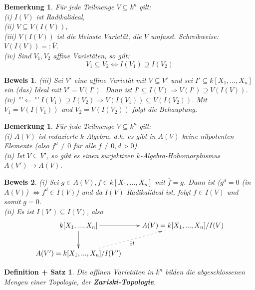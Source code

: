 \documentclass[a4paper,12pt]{report}
\theoremstyle{break}
\newtheorem{DefSatz}[Def]{Definition + Satz}
\newtheorem{Bem}[Def]{Bemerkung}
\theoremstyle{nonumberbreak}
\theoremstyle{nonumberplain}
\newtheorem{Bew}{Beweis}
\newcommand{\emp}[1]{\textbf{\emph{#1}}}
\newcommand{\begriff}[1]{{\index{#1}}\emp{#1}}
\newcommand{\defeql}[0]{=\mathrel{\mathop:}}
\begin{document}
\begin{Bem}
\label{bem:2.4}
Für jede Teilmenge $V\subseteq k^n$ gilt:\\
(i) $I(V)$ ist Radikalideal,\\
(ii) $V\subseteq V(I(V))$,\\
(iii) $V(I(V))$ ist die kleinste Varietät, die $V$ umfasst. Schreibweise: $V(I(V))\defeql\overline{V}$.\\
(iv) Sind $V_1, V_2$ affine Varietäten, so gilt:
$$V_1\subseteq V_2 \Leftrightarrow I(V_1)\supseteq I(V_2)$$
\end{Bem}
\begin{Bew}
(iii) Sei $V'$ eine affine Varietät mit $V\subseteq V'$ und sei $I'\subseteq k[X_1,...,X_n]$ ein (das) Ideal mit $V'=V(I')$. Dann ist $I'\subseteq I(V)\Rightarrow V(I')\supseteq V(I(V))$.\\
(iv) "'$\Leftarrow$"' $I(V_1)\supseteq I(V_2)\Rightarrow V(I(V_1))\subseteq V(I(V_2))$. Mit $V_1 = V(I(V_1))$ und $V_2= V(I(V_2))$ folgt die Behauptung.
\end{Bew}
\begin{Bem}
\label{bem:2.5}
Für jede Teilmenge $V\subseteq k^n$ gilt:\\
(i) $A(V)$ ist reduzierte $k$-Algebra, d.h. es gibt in $A(V)$ keine nilpotenten Elemente (also $f^d\neq 0$ für alle $f \neq 0, d>0$).\\
(ii) Ist $V\subseteq V'$, so gibt es einen surjektiven $k$-Algebra-Hohomorphismus $A(V')\longrightarrow A(V)$.
\end{Bem}
\begin{Bew}
(i) Sei $g\in A(V), f\in k[X_1,...,X_n]$ mit $\overline{f}=g$. Dann ist ($g^d=0$ (in $A(V)$) $\Leftrightarrow f^d\in I(V)$) und da $I(V)$ Radikalideal ist, folgt $f\in I(V)$ und somit $g=0$.\\
(ii) Es ist $I(V')\subseteq I(V)$, also 
\[
\begin{xy}
\xymatrix{
k[X_1,...,X_n]\ar[r]\ar[d]&A(V)=k[X_1,...,X_n]/I(V) \\
A(V')=k[X_1,...,X_n]/I(V')\ar@{.>}[ur]_{\exists !}&
}
\end{xy}
\]
\end{Bew}
\begin{DefSatz}
\label{defsatz:2.6}
Die affinen Varietäten in $k^n$ bilden die abgeschlossenen Mengen einer Topologie, der \begriff{Zariski-Topologie}.
\end{DefSatz}
\end{document}
